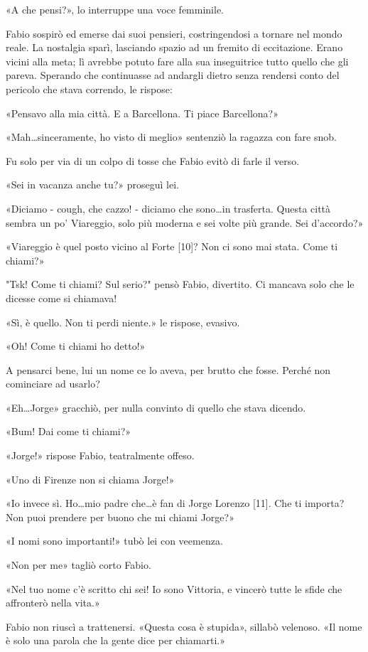 «A che pensi?», lo interruppe una voce femminile.

Fabio sospirò ed emerse dai suoi pensieri, costringendosi a tornare nel mondo reale. La nostalgia sparì, lasciando spazio ad un fremito di eccitazione. Erano vicini alla meta; lì avrebbe potuto fare alla sua inseguitrice tutto quello che gli pareva. Sperando che continuasse ad andargli dietro senza rendersi conto del pericolo che stava correndo, le rispose:

«Pensavo alla mia città. E a Barcellona. Ti piace Barcellona?»

«Mah\ldots sinceramente, ho visto di meglio» sentenziò la ragazza con fare snob.

Fu solo per via di un colpo di tosse che Fabio evitò di farle il verso.

«Sei in vacanza anche tu?» proseguì lei.

«Diciamo - cough, che cazzo! - diciamo che sono\ldots in trasferta. Questa città sembra un po' Viareggio, solo più moderna e sei volte più grande. Sei d'accordo?»

«Viareggio è quel posto vicino al Forte [10]? Non ci sono mai stata. Come ti chiami?»

"Tsk! Come ti chiami? Sul serio?" pensò Fabio, divertito. Ci mancava solo che le dicesse come si chiamava!

«Sì, è quello. Non ti perdi niente.» le rispose, evasivo.

«Oh! Come ti chiami ho detto!»

A pensarci bene, lui un nome ce lo aveva, per brutto che fosse. Perché non cominciare ad usarlo?

«Eh\ldots Jorge» gracchiò, per nulla convinto di quello che stava dicendo.

«Bum! Dai come ti chiami?»

«Jorge!» rispose Fabio, teatralmente offeso.

«Uno di Firenze non si chiama Jorge!»

«Io invece sì. Ho\ldots mio padre che\ldots è fan di Jorge Lorenzo [11]. Che ti importa? Non puoi prendere per buono che mi chiami Jorge?»

«I nomi sono importanti!» tubò lei con veemenza.

«Non per me» tagliò corto Fabio.

«Nel tuo nome c'è scritto chi sei! Io sono Vittoria, e vincerò tutte le sfide che affronterò nella vita.»

Fabio non riuscì a trattenersi. «Questa cosa è stupida», sillabò velenoso. «Il nome è solo una parola che la gente dice per chiamarti.»

